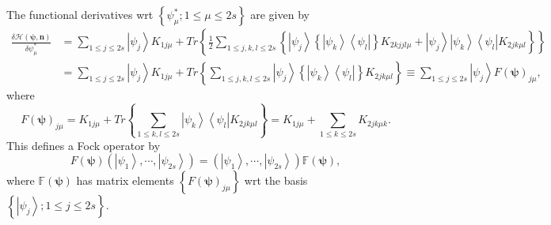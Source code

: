 \documentclass[aps,preprint]{revtex4}%
\begin{document}
The functional derivatives wrt $\left\{  \psi_{\mu}^{\ast};1\leq\mu
\leq2s\right\}  $ are given by%
\begin{align}
\frac{\delta\mathcal{H}\left(  \mathbf{\psi,n}\right)  }{\delta\psi_{\mu
}^{\ast}}  &  =\sum_{1\leq j\leq2s}\left\vert \psi_{j}\right\rangle K_{1j\mu
}+Tr\left\{  \frac{1}{2}\sum_{1\leq j,k,l\leq2s}\left\{  \left\vert \psi
_{j}\right\rangle \left\{  \left\vert \psi_{k}\right\rangle \left\langle
\psi_{l}\right\vert \right\}  K_{2kjjl\mu}+\left\vert \psi_{j}\right\rangle
\left\vert \psi_{k}\right\rangle \left\langle \psi_{l}\right\vert K_{2jk\mu
l}\right\}  \right\} \nonumber\\
&  =\sum_{1\leq j\leq2s}\left\vert \psi_{j}\right\rangle K_{1j\mu}+Tr\left\{
\sum_{1\leq j,k,l\leq2s}\left\vert \psi_{j}\right\rangle \left\{  \left\vert
\psi_{k}\right\rangle \left\langle \psi_{l}\right\vert \right\}  K_{2jk\mu
l}\right\}  \equiv\sum_{1\leq j\leq2s}\left\vert \psi_{j}\right\rangle
F\left(  \mathbf{\psi}\right)  _{j\mu},
\end{align}
where
\begin{equation}
F\left(  \mathbf{\psi}\right)  _{j\mu}=K_{1j\mu}+Tr\left\{  \sum_{1\leq
k,l\leq2s}\left\vert \psi_{k}\right\rangle \left\langle \psi_{l}\right\vert
K_{2jk\mu l}\right\}  =K_{1j\mu}+\sum_{1\leq k\leq2s}K_{2jk\mu k}.
\end{equation}
This defines a Fock operator by
\begin{equation}
F\left(  \mathbf{\psi}\right)  \left(  \left\vert \psi_{1}\right\rangle
,\cdots,\left\vert \psi_{2s}\right\rangle \right)  =\left(  \left\vert
\psi_{1}\right\rangle ,\cdots,\left\vert \psi_{2s}\right\rangle \right)
\mathbb{F}\left(  \mathbf{\psi}\right)  ,
\end{equation}
where $\mathbb{F}\left(  \mathbf{\psi}\right)  $ has matrix elements $\left\{
F\left(  \mathbf{\psi}\right)  _{j\mu}\right\}  $ wrt the basis $\left\{
\left\vert \psi_{j}\right\rangle ;1\leq j\leq2s\right\}  .$
\end{document}
